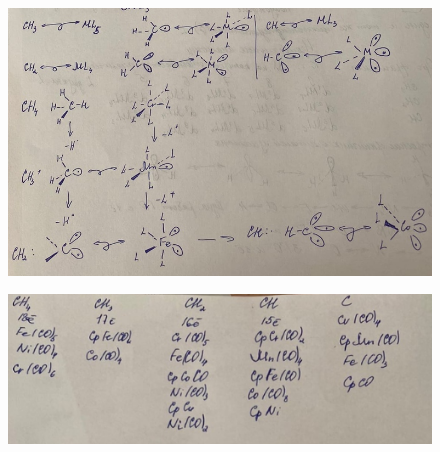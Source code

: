 \begin{figure}[H]
\centering
\includegraphics[scale=.300]{images/isolab_2.png}
\end{figure}


\begin{figure}[H]
\centering
\includegraphics[scale=.300]{images/isolab_3.png}
\end{figure}







